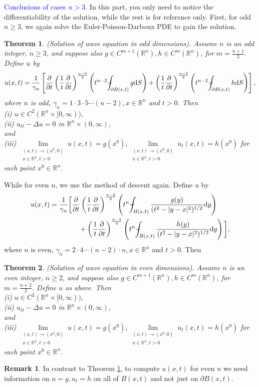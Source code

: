 \documentclass[hyperref,UTF8,12pt]{article}
\numberwithin{equation}{subsection}
\theoremstyle{plain}
\newtheorem{theorem}{Theorem}
\theoremstyle{definition}
\newtheorem{remark}{Remark}
\numberwithin{theorem}{section}
\numberwithin{lemma}{section}
\numberwithin{proposition}{section}
\numberwithin{remark}{section}
\numberwithin{corollary}{section}
\numberwithin{definition}{section}
\numberwithin{problem}{section}
\numberwithin{example}{section}
\def\dif{\textup{d}}
\def\Xint#1{\mathchoice
	{\XXint\displaystyle\textstyle{#1}}%
	{\XXint\textstyle\scriptstyle{#1}}%
	{\XXint\scriptstyle\scriptscriptstyle{#1}}%
	{\XXint\scriptscriptstyle\scriptscriptstyle{#1}}%
	\!\int}
\def\XXint#1#2#3{{\setbox0=\hbox{$#1{#2#3}{\int}$ }
		\vcenter{\hbox{$#2#3$ }}\kern-.55\wd0}}
\def\dashint{\Xint-}
\newcommand{\limls}{\lim\limits}
\newcommand{\ptl}{\partial}
\newcommand{\mr}{\mathbb{R}}
\renewcommand{\geq}{\geqslant}
\begin{document}
\noindent\textcolor{blue}{Conclusions of cases $n>3$.} In this part, you only need to notice the differentiability of the solution, while the rest is for reference only. First, for odd $n\geq3$, we again solve the Euler-Poisson-Darboux PDE to gain the solution.
\begin{theorem}\label{thm2.28}
(Solution of wave equation in odd dimensions). Assume $n$ is an odd integer, $n \geq 3$, and suppose also $g\in C^{m+1}(\mr^n), h\in C^m(\mr^n)$, for $m=\frac{n+1}{2}$. Define $u$ by \[u(x,t)=\frac{1}{\gamma_n}\left[\frac{\ptl}{\ptl t}\left(\frac{1}{t} \frac{\ptl}{\ptl t}\right)^{\frac{n-3}{2}}\left(t^{n-2}\dashint_{\ptl B(x,t)}g\dif S\right)+\left(\frac{1}{t}\frac{\ptl}{\ptl t}\right)^{\frac{n-3}{2}}\left(t^{n-2}\dashint_{\ptl B(x,t)}h\dif S\right)\right],\]where $n$ is odd, $\gamma_n=1\cdot3\cdot5\cdots(n-2),x\in\mr^n$ and $t>0$. Then\\
\textup{(i)} $u\in C^2(\mr^n\times[0,\infty))$,\\
\textup{(ii)} $u_{tt}-\Delta u=0$ in $\mr^n\times(0,\infty)$,\\and\\ \textup{(iii)}
 $\limls_{\substack{(x,t)\to(x^0,0)\\x\in\mr^n,t>0}}u(x,t)=g(x^0),\limls_{\substack {(x,t)\to(x^0,0)\\x\in\mr^n,t>0}}u_t(x,t)=h(x^0)$ for each point $x^0\in\mr^n$.
\end{theorem}
While for even $n$, we use the method of descent again. Define $u$ by\[\begin{aligned}
	u(x, t)=\frac{1}{\gamma_n}\bigg[&\frac{\ptl}{\ptl t}\left(\frac{1}{t}\frac{\ptl}{\ptl t}\right)^{\frac{n-2}{2}}\left(t^n\dashint_{B(x,t)}\frac{g(y)}{(t^2-|y-x|^2)^{1/2}}\dif y\right)\\
	&\quad+\left(\frac{1}{t}\frac{\ptl}{\ptl t}\right)^{\frac{n-2}{2}}\left(t^n\dashint_{B(x,t)}\frac{h(y)}{(t^2-|y-x|^2)^{1/2}}\dif y\right)\bigg],
\end{aligned}\]where $n$ is even, $\gamma_n=2\cdot4\cdots(n-2)\cdot n,x\in\mr^n$ and $t>0$. Then
\begin{theorem}\label{thm2.29}
(Solution of wave equation in even dimensions). Assume $n$ is an even integer, $n\geq2$, and suppose also $g\in C^{m+1}(\mr^n),h\in C^m(\mr^n)$, for $m=\frac{n+2}{2}$. Define $u$ as above. Then\\
\textup{(i)} $u\in C^2(\mr^n\times[0,\infty))$,\\
\textup{(ii)} $u_{tt}-\Delta u=0$ in $\mr^n\times(0,\infty)$,\\and\\ \textup{(iii)}
$\limls_{\substack{(x,t)\to(x^0,0)\\x\in\mr^n,t>0}}u(x,t)=g(x^0),\limls_{\substack {(x,t)\to(x^0,0)\\x\in\mr^n,t>0}}u_t(x,t)=h(x^0)$ for each point $x^0\in\mr^n$.
\end{theorem}
\begin{remark}
In contrast to Theorem \ref{thm2.28}, to compute $u(x,t)$ for even $n$ we need information on $u=g, u_t=h$ on all of $B(x, t)$ and not just on $\ptl B(x,t)$.
\end{remark}
\end{document}
